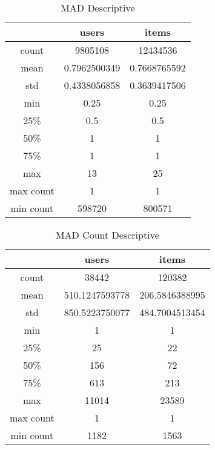 \begin{table}[H]
\centering
\caption{MAD Descriptive}
\label{table:mad_descriptive}
\begin{tabular}{|c|c|c|}
\hline
          & \textbf{users} & \textbf{items} \\ \hline
count     & 9805108        & 12434536       \\ \hline
mean      & 0.7962500349   & 0.7668765592   \\ \hline
std       & 0.4338056858   & 0.3639417506   \\ \hline
min       & 0.25           & 0.25           \\ \hline
25\%      & 0.5            & 0.5            \\ \hline
50\%      & 1              & 1              \\ \hline
75\%      & 1              & 1              \\ \hline
max       & 13             & 25             \\ \hline
max count & 1              & 1              \\ \hline
min count & 598720         & 800571         \\ \hline
\end{tabular}
\end{table}

\begin{table}[H]
\centering
\caption{MAD Count Descriptive}
\label{table:mad_count_descriptive}
\begin{tabular}{|c|c|c|}
\hline
          & users          & items          \\ \hline
count     & 38442          & 120382         \\ \hline
mean      & 510.1247593778 & 206.5846388995 \\ \hline
std       & 850.5223750077 & 484.7004513454 \\ \hline
min       & 1              & 1              \\ \hline
25\%      & 25             & 22             \\ \hline
50\%      & 156            & 72             \\ \hline
75\%      & 613            & 213            \\ \hline
max       & 11014          & 23589          \\ \hline
max count & 1              & 1              \\ \hline
min count & 1182           & 1563			\\ \hline
\end{tabular}
\end{table}

